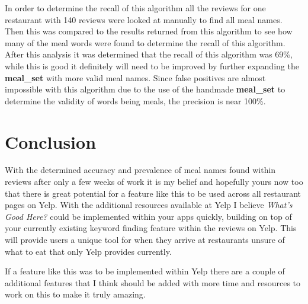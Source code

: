 \documentclass[12pt, openany]{scrbook}
\begin{document}
In order to determine the recall of this algorithm all the reviews for
one restaurant with 140 reviews were looked at manually to find all meal names.
Then this was compared to the results returned from this algorithm to see how
many of the meal words were found to determine the recall of this algorithm.
After this analysis it was determined that the recall of this algorithm
was 69\%, while this is good it definitely will need to be improved by further
expanding the \textbf{meal\_set} with more valid meal names.
Since false positives are almost impossible with this algorithm due to the
use of the handmade \textbf{meal\_set} to determine the validity of words being meals,
the precision is near 100\%.

\chapter{Conclusion}

With the determined accuracy and prevalence of meal names found within reviews after
only a few weeks of work it is my belief and hopefully yours now too that there
is great potential for a feature like this to be used across all restaurant pages
on Yelp.
With the additional resources available at Yelp I believe \emph{What's Good Here?}
could be implemented within your apps quickly, building on top of your
currently existing keyword finding feature within the reviews on Yelp.
This will provide users a unique tool for when they arrive at restaurants
unsure of what to eat that only Yelp provides currently.

If a feature like this was to be implemented within Yelp there are a
couple of additional features that I think should be added with more
time and resources to work on this to make it truly amazing.
\end{document}
